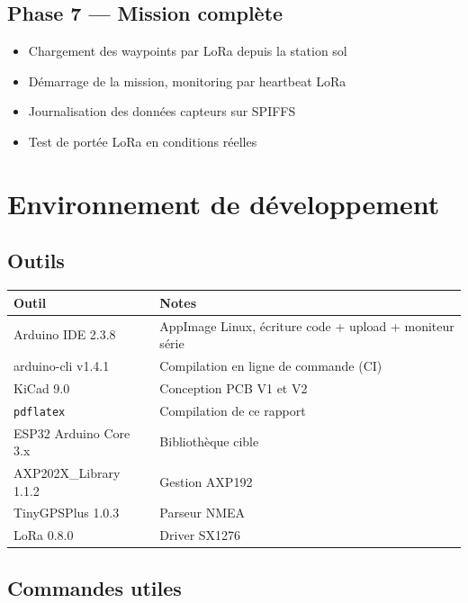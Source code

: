 \documentclass[12pt,a4paper]{article}
\begin{document}
\subsection{Phase 7 — Mission complète}

\begin{itemize}
  \item Chargement des waypoints par LoRa depuis la station sol
  \item Démarrage de la mission, monitoring par heartbeat LoRa
  \item Journalisation des données capteurs sur SPIFFS
  \item Test de portée LoRa en conditions réelles
\end{itemize}

\section{Environnement de développement}

\subsection{Outils}

\begin{longtable}{L{4cm} L{9cm}}
  \toprule
  \textcolor{tableheadfg}{\textbf{Outil}} &
  \textcolor{tableheadfg}{\textbf{Notes}} \\
  \midrule
  \endhead
  \bottomrule
  \endfoot
  Arduino IDE 2.3.8 & AppImage Linux, écriture code + upload + moniteur série \\[3pt]
  arduino-cli v1.4.1 & Compilation en ligne de commande (CI) \\[3pt]
  KiCad 9.0 & Conception PCB V1 et V2 \\[3pt]
  \texttt{pdflatex} & Compilation de ce rapport \\[3pt]
  ESP32 Arduino Core 3.x & Bibliothèque cible \\[3pt]
  AXP202X\_Library 1.1.2 & Gestion AXP192 \\[3pt]
  TinyGPSPlus 1.0.3 & Parseur NMEA \\[3pt]
  LoRa 0.8.0 & Driver SX1276 \\
\end{longtable}

\subsection{Commandes utiles}
\end{document}
